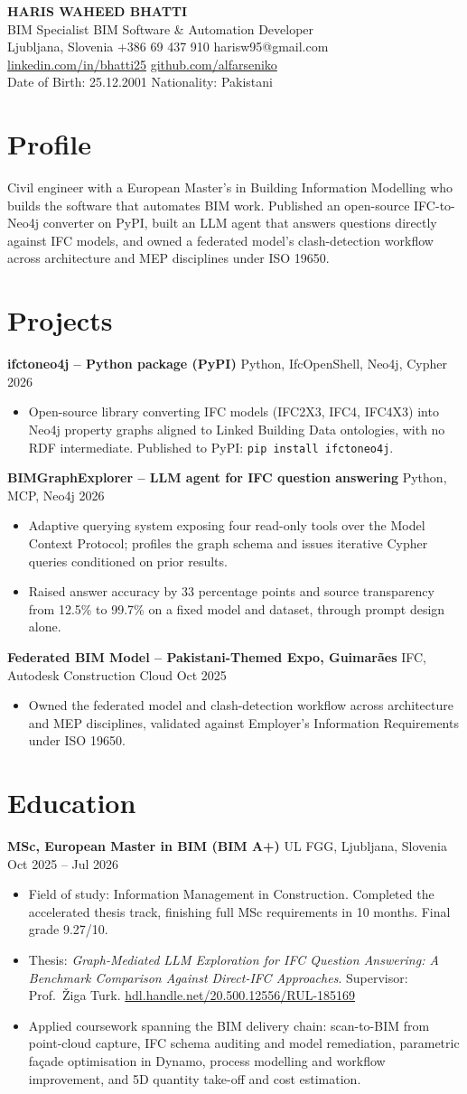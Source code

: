 \documentclass[a4paper,10.5pt]{article}
\newcommand{\datefill}{\dotfill}
\newcommand{\entry}[3]{\vspace{2.5pt}\noindent\textbf{#1} \textbar{} #2 \datefill{} #3\par\vspace{0.5pt}}
\newcommand{\ROLELINE}{BIM Specialist \textbar{} BIM Software \& Automation Developer}
\newcommand{\projIfcToNeo}{%
\entry{ifctoneo4j -- Python package (PyPI)}{Python, IfcOpenShell, Neo4j, Cypher}{2026}
\begin{itemize}
  \item Open-source library converting IFC models (IFC2X3, IFC4, IFC4X3) into Neo4j
        property graphs aligned to Linked Building Data ontologies, with no RDF
        intermediate. Published to PyPI: \texttt{pip install ifctoneo4j}.
\end{itemize}}
\newcommand{\projBIMGraph}{%
\entry{BIMGraphExplorer -- LLM agent for IFC question answering}{Python, MCP, Neo4j}{2026}
\begin{itemize}
  \item Adaptive querying system exposing four read-only tools over the Model
        Context Protocol; profiles the graph schema and issues iterative Cypher
        queries conditioned on prior results.
  \item Raised answer accuracy by 33 percentage points and source transparency from
        12.5\% to 99.7\% on a fixed model and dataset, through prompt design alone.
\end{itemize}}
\newcommand{\projGuimaraes}{%
\entry{Federated BIM Model -- Pakistani-Themed Expo, Guimar\~aes}{IFC, Autodesk Construction Cloud}{Oct 2025}
\begin{itemize}
  \item Owned the federated model and clash-detection workflow across architecture
        and MEP disciplines, validated against Employer's Information Requirements
        under ISO 19650.
\end{itemize}}
\begin{document}
\begin{center}
  {\LARGE\bfseries HARIS WAHEED BHATTI}\\[2pt]
  {\large \ROLELINE}\\[3pt]
  Ljubljana, Slovenia \textbar{} +386 69 437 910 \textbar{} harisw95@gmail.com\\
  \href{https://linkedin.com/in/bhatti25}{linkedin.com/in/bhatti25} \textbar{}
  \href{https://github.com/alfarseniko}{github.com/alfarseniko}\\
  Date of Birth: 25.12.2001 \textbar{} Nationality: Pakistani
\end{center}
\vspace{-4pt}

\section{Profile}

\noindent Civil engineer with a European Master's in Building Information Modelling
who builds the software that automates BIM work. Published an open-source
IFC-to-Neo4j converter on PyPI, built an LLM agent that answers questions directly
against IFC models, and owned a federated model's clash-detection workflow across
architecture and MEP disciplines under ISO 19650.

\section{Projects}

 \projIfcToNeo \projBIMGraph \projGuimaraes

\section{Education}
\entry{MSc, European Master in BIM (BIM A+)}{UL FGG, Ljubljana, Slovenia}{Oct 2025 -- Jul 2026}
\begin{itemize}
  \item Field of study: Information Management in Construction. Completed the
        accelerated thesis track, finishing full MSc requirements in 10 months.
        Final grade 9.27/10.
  \item Thesis: \textit{Graph-Mediated LLM Exploration for IFC Question Answering:
        A Benchmark Comparison Against Direct-IFC Approaches}. Supervisor:
        Prof.~\v{Z}iga Turk. \href{http://hdl.handle.net/20.500.12556/RUL-185169}{hdl.handle.net/20.500.12556/RUL-185169}
  \item Applied coursework spanning the BIM delivery chain: scan-to-BIM from point-cloud capture, IFC schema auditing and model remediation, parametric façade optimisation in Dynamo, process modelling and workflow improvement, and 5D quantity take-off and cost estimation.
\end{itemize}
\end{document}
